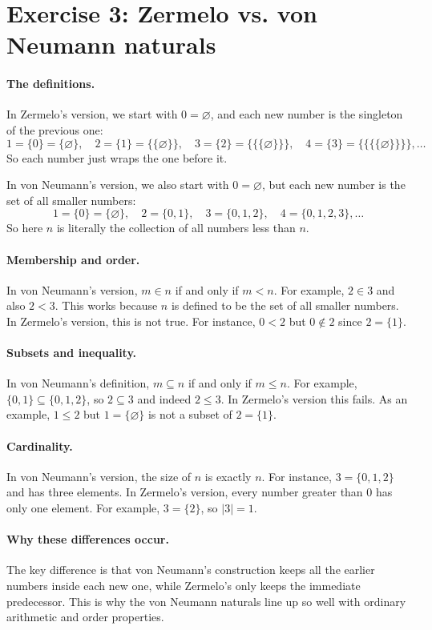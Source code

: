 \documentclass[11pt]{article}
\begin{document}
\section*{Exercise 3: Zermelo vs. von Neumann naturals}

\paragraph{The definitions.}
In Zermelo’s version, we start with $0=\varnothing$, and each new number is the singleton of the previous one:
\[
1=\{0\}=\{\varnothing\}, \quad
2=\{1\}=\{\{\varnothing\}\}, \quad
3=\{2\}=\{\{\{\varnothing\}\}\}, \quad
4=\{3\}=\{\{\{\{\varnothing\}\}\}\}, \ldots
\]
So each number just wraps the one before it.

In von Neumann’s version, we also start with $0=\varnothing$, but each new number is the set of all smaller numbers:
\[
1=\{0\}=\{\varnothing\}, \quad
2=\{0,1\}, \quad
3=\{0,1,2\}, \quad
4=\{0,1,2,3\}, \ldots
\]
So here $n$ is literally the collection of all numbers less than $n$.

\paragraph{Membership and order.}
In von Neumann’s version, $m\in n$ if and only if $m<n$. For example, $2\in 3$ and also $2<3$. This works because $n$ is defined to be the set of all smaller numbers. In Zermelo’s version, this is not true. For instance, $0<2$ but $0\notin 2$ since $2=\{1\}$.

\paragraph{Subsets and inequality.}
In von Neumann’s definition, $m\subseteq n$ if and only if $m\le n$. For example, $\{0,1\}\subseteq\{0,1,2\}$, so $2\subseteq 3$ and indeed $2\le 3$. In Zermelo’s version this fails. As an example, $1\le 2$ but $1=\{\varnothing\}$ is not a subset of $2=\{1\}$.

\paragraph{Cardinality.}
In von Neumann’s version, the size of $n$ is exactly $n$. For instance, $3=\{0,1,2\}$ and has three elements. In Zermelo’s version, every number greater than $0$ has only one element. For example, $3=\{2\}$, so $|3|=1$.

\paragraph{Why these differences occur.}
The key difference is that von Neumann’s construction keeps all the earlier numbers inside each new one, while Zermelo’s only keeps the immediate predecessor. This is why the von Neumann naturals line up so well with ordinary arithmetic and order properties.
\end{document}
